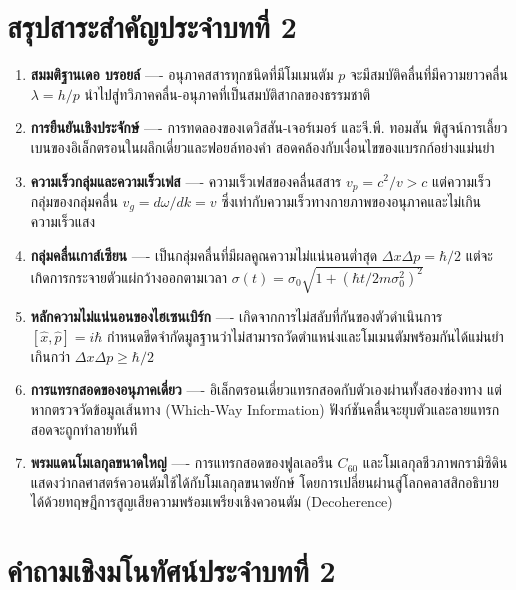 \section{สรุปสาระสำคัญประจำบทที่ 2}

\begin{enumerate}
    \item \textbf{สมมติฐานเดอ บรอยล์} ---- อนุภาคสสารทุกชนิดที่มีโมเมนตัม $p$ จะมีสมบัติคลื่นที่มีความยาวคลื่น $\lambda = h/p$ นำไปสู่ทวิภาคคลื่น-อนุภาคที่เป็นสมบัติสากลของธรรมชาติ
    \item \textbf{การยืนยันเชิงประจักษ์} ---- การทดลองของเดวิสสัน-เจอร์เมอร์ และจี.พี. ทอมสัน พิสูจน์การเลี้ยวเบนของอิเล็กตรอนในผลึกเดี่ยวและฟอยล์ทองคำ สอดคล้องกับเงื่อนไขของแบรกก์อย่างแม่นยำ
    \item \textbf{ความเร็วกลุ่มและความเร็วเฟส} ---- ความเร็วเฟสของคลื่นสสาร $v_p = c^2/v > c$ แต่ความเร็วกลุ่มของกลุ่มคลื่น $v_g = d\omega/dk = v$ ซึ่งเท่ากับความเร็วทางกายภาพของอนุภาคและไม่เกินความเร็วแสง
    \item \textbf{กลุ่มคลื่นเกาส์เซียน} ---- เป็นกลุ่มคลื่นที่มีผลคูณความไม่แน่นอนต่ำสุด $\Delta x \Delta p = \hbar/2$ แต่จะเกิดการกระจายตัวแผ่กว้างออกตามเวลา $\sigma(t) = \sigma_0\sqrt{1 + (\hbar t / 2m\sigma_0^2)^2}$
    \item \textbf{หลักความไม่แน่นอนของไฮเซนเบิร์ก} ---- เกิดจากการไม่สลับที่กันของตัวดำเนินการ $[\hat{x}, \hat{p}] = i\hbar$ กำหนดขีดจำกัดมูลฐานว่าไม่สามารถวัดตำแหน่งและโมเมนตัมพร้อมกันได้แม่นยำเกินกว่า $\Delta x \Delta p \ge \hbar/2$
    \item \textbf{การแทรกสอดของอนุภาคเดี่ยว} ---- อิเล็กตรอนเดี่ยวแทรกสอดกับตัวเองผ่านทั้งสองช่องทาง แต่หากตรวจวัดข้อมูลเส้นทาง (Which-Way Information) ฟังก์ชันคลื่นจะยุบตัวและลายแทรกสอดจะถูกทำลายทันที
    \item \textbf{พรมแดนโมเลกุลขนาดใหญ่} ---- การแทรกสอดของฟูลเลอรีน $C_{60}$ และโมเลกุลชีวภาพกรามิซิดินแสดงว่ากลศาสตร์ควอนตัมใช้ได้กับโมเลกุลขนาดยักษ์ โดยการเปลี่ยนผ่านสู่โลกคลาสสิกอธิบายได้ด้วยทฤษฎีการสูญเสียความพร้อมเพรียงเชิงควอนตัม (Decoherence)
\end{enumerate}

\section{คำถามเชิงมโนทัศน์ประจำบทที่ 2}

